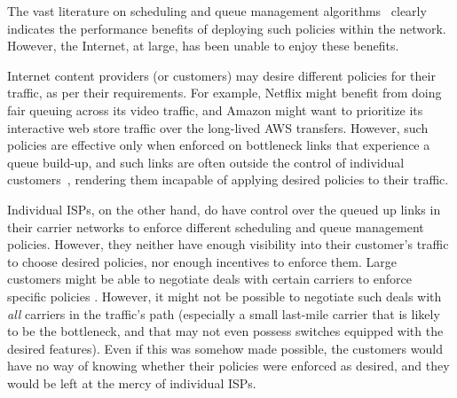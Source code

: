 
The vast literature on scheduling and queue management algorithms~\cite{diffserv, fair-queueing, sfq, pie, CoDel, fifoplus, virtualClocks, csfq, drr, red, ecn} clearly indicates the performance benefits of deploying such policies within the network. However, the Internet, at large, has been unable to enjoy these benefits. 

Internet content providers (or customers) may desire different policies for their traffic, as per their requirements. For example, Netflix might benefit from doing fair queuing across its video traffic, and Amazon might want to prioritize its interactive web store traffic over the long-lived AWS transfers. However, such policies are effective only when enforced on bottleneck links that experience a queue build-up, and such links are often outside the control of individual customers~\cite{inferring-interdomain-congestion}, rendering them incapable of applying desired policies to their traffic. 

Individual ISPs, on the other hand, do have control over the queued up links in their carrier networks to enforce different scheduling and queue management policies. However, they neither have enough visibility into their customer's traffic to choose desired policies, nor enough incentives to enforce them. Large customers might be able to negotiate deals with certain carriers to enforce specific policies . However, it might not be possible to negotiate such deals with \emph{all} carriers in the traffic's path (especially a small last-mile carrier that is likely to be the bottleneck, and that may not even possess switches equipped with the desired features). Even if this was somehow made possible, the customers would have no way of knowing whether their policies were enforced as desired, and they would be left at the mercy of individual ISPs.

